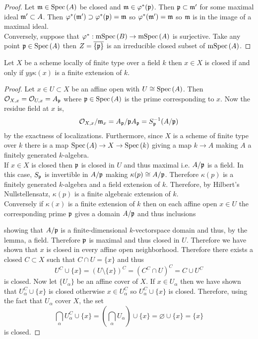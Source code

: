 \documentclass[12pt]{article}
\begin{document}
\begin{proof}
Let $\mathfrak{m} \in \mathrm{Spec}\left( A \right)$ be closed and $\mathfrak{m} \in \varphi^*(\mathfrak{p})$. Then $\mathfrak{p} \subset \mathfrak{m}'$ for some maximal ideal $\mathfrak{m}' \subset A$. Then $\varphi^*(\mathfrak{m}') \supset \varphi^*(\mathfrak{p}) = \mathfrak{m}$ so $\varphi^*(\mathfrak{m}') = \mathfrak{m}$ so $\mathfrak{m}$ is in the image of a maximal ideal. 
\bigskip\\
Conversely, suppose that $\varphi^* : \mathrm{mSpec}\left( B \right) \to \mathrm{mSpec}\left( A \right)$ is surjective. Take any point $\mathfrak{p} \in \mathrm{Spec}\left( A \right)$ then $Z = \overline{\{ \mathfrak{p} \}}$ is an irreducible closed subset of $\mathrm{mSpec}\left( A \right)$. 
\end{proof}

\begin{proposition}
Let $X$ be a scheme locally of finite type over a field $k$ then $x \in X$ is closed if and only if $yy\kappa(x)$ is a finite extension of $k$. 
\end{proposition}

\begin{proof}
Let $x \in U \subset X$ be an affine open with $U \cong \mathrm{Spec}\left( A \right)$. Then $\mathcal{O}_{X, x} = \mathcal{O}_{U, x} = A_{\mathfrak{p}}$ where $\mathfrak{p} \in \mathrm{Spec}\left( A \right)$ is the prime corresponding to $x$. Now the residue field at $x$ is, 
\[ \mathcal{O}_{X, x} / \mathfrak{m}_x = A_{\mathfrak{p}} / \mathfrak{p} A_{\mathfrak{p}} = S_{\mathfrak{p}}^{-1} ( A / \mathfrak{p} ) \]
by the exactness of localizations. Furthermore, since $X$ is a scheme of finite type over $k$ there is a map $\mathrm{Spec}\left( A \right) \to X \to \mathrm{Spec}\left( k \right)$ giving a map $k \to A$ making $A$ a finitely generated $k$-algebra. 
\bigskip\\
If $x \in X$ is closed then $\mathfrak{p}$ is closed in $U$ and thus maximal i.e. $A / \mathfrak{p}$ is a field. In this case, $S_{\mathfrak{p}}$ is invertible in $A / \mathfrak{p}$ making $\kappa(p) \cong A / \mathfrak{p}$. Therefore $\kappa(p)$ is a finitely generated $k$-algebra and a field extension of $k$. Therefore, by Hilbert's Nullstellensatz, $\kappa(p)$ is a finite algebraic extension of $k$.
\bigskip\\
Conversely if $\kappa(x)$ is a finite extension of $k$ then on each affine open $x \in U$ the corresponding prime $\mathfrak{p}$ gives a domain $A / \mathfrak{p}$ and thus inclusions
\begin{center}
\end{center}
showing that $A / \mathfrak{p}$ is a finite-dimensional $k$-vectorspace domain and thus, by the lemma, a field. Therefore $\mathfrak{p}$ is maximal and thus closed in $U$. Therefore we have shown that $x$ is closed in every affine open neighborhood. Therefore there exists a closed $C \subset X$ such that $C \cap U = \{ x \}$ and thus \[ U^C \cup \{ x \} = (U \setminus \{ x \})^C = (C^C \cap U)^C = C \cup U^C \]
is closed. Now let $\{ U_\alpha \}$ be an affine cover of $X$. If $x \in U_\alpha$ then we have shown that $U_\alpha^C \cup \{ x \}$ is closed otherwise $x \in U_\alpha^C$ so $U_\alpha^C \cup \{ x \}$ is closed. Therefore, using the fact that $U_\alpha$ cover $X$, the set
\[ \bigcap_{\alpha} U^C_\alpha \cup \{ x \} = \left( \bigcap_\alpha U_\alpha \right) \cup \{ x \} = \varnothing \cup \{ x \} = \{ x \} \]   
is closed. 
\end{proof}
\end{document}
